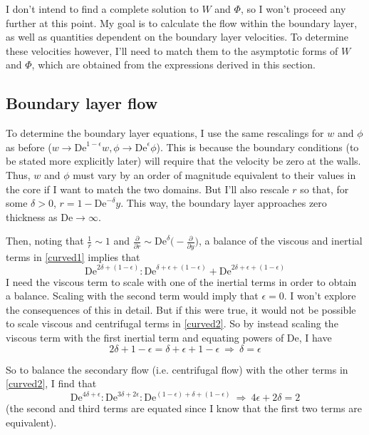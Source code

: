 \documentclass[10pt,a4paper]{report}
\begin{document}
I don't intend to find a complete solution to $W$ and $\Phi$, so I won't proceed any further at this point. My goal is to calculate the flow within the boundary layer, as well as quantities dependent on the boundary layer velocities. To determine these velocities however, I'll need to match them to the asymptotic forms of $W$ and $\Phi$, which are obtained from the expressions derived in this section.

\subsection{Boundary layer flow}

To determine the boundary layer equations, I use the same rescalings for $w$ and $\phi$ as before ($w \rightarrow \textrm{De}^{1-\epsilon} w, \phi \rightarrow \textrm{De}^\epsilon \phi$). This is because the boundary conditions (to be stated more explicitly later) will require that the velocity be zero at the walls. Thus, $w$ and $\phi$ must vary by an order of magnitude equivalent to their values in the core if I want to match the two domains. But I'll also rescale $r$ so that, for some $\delta > 0$, $r = 1 - \textrm{De}^{-\delta} y$. This way, the boundary layer approaches zero thickness as $\textrm{De} \rightarrow \infty$.

Then, noting that $\frac{1}{r} \sim 1$ and $\frac{\partial}{\partial r} \sim \textrm{De}^\delta \big(-\frac{\partial}{\partial y}\big)$, a balance of the viscous and inertial terms in \eqref{curved1} implies that
\begin{equation*}
\textrm{De}^{2\delta + (1 - \epsilon)} : \textrm{De}^{\delta + \epsilon+ (1 - \epsilon)} + \textrm{De}^{2 \delta + \epsilon + (1 - \epsilon)}
\end{equation*}
I need the viscous term to scale with one of the inertial terms in order to obtain a balance. Scaling with the second term would imply that $\epsilon = 0$. I won't explore the consequences of this in detail. But if this were true, it would not be possible to scale viscous and centrifugal terms in \eqref{curved2}. So by instead scaling the viscous term with the first inertial term and equating powers of $\textrm{De}$, I have
\begin{equation*}
2 \delta + 1 - \epsilon = \delta + \epsilon + 1 - \epsilon \ \Rightarrow \ \delta = \epsilon
\end{equation*}

So to balance the secondary flow (i.e. centrifugal flow) with the other terms in \eqref{curved2}, I find that
\begin{equation*}
\textrm{De}^{4\delta + \epsilon} : \textrm{De}^{3\delta + 2\epsilon} : \textrm{De}^{(1 - \epsilon) + \delta + (1 - \epsilon)} \ \Rightarrow \ 4\epsilon + 2\delta = 2
\end{equation*}
(the second and third terms are equated since I know that the first two terms are equivalent).
\end{document}
